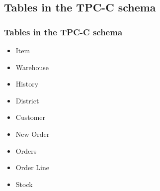 \documentclass[12pt]{beamer}
\begin{document}
\subsection{Tables in the TPC-C schema}
\begin{frame}[c]
\frametitle{Tables in the TPC-C schema}
\begin{itemize}
 \item Item
 \item Warehouse
 \item History
 \item District
 \item Customer
 \item New Order
 \item Orders
 \item Order Line
 \item Stock
\end{itemize}

\end{frame}

\end{document}
